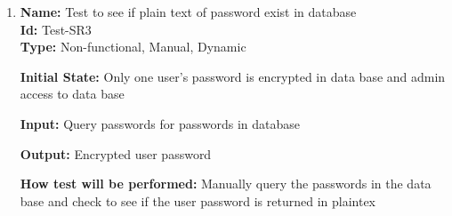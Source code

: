 \documentclass[12pt, titlepage]{article}
\begin{document}
\begin{enumerate}
    					
    					
    					
    
    \item{\textbf{Name:} Test to see if plain text of password exist in database\\} \label{Test-SR3}
    \textbf{Id:} Test-SR3\\
    
    \textbf{Type:} Non-functional, Manual, Dynamic
    					
    \textbf{Initial State:} Only one user's password is encrypted in data base and admin access to data base
    					
    \textbf{Input:} Query passwords for passwords in database
    					
    \textbf{Output:} Encrypted user password
    					
    \textbf{How test will be performed:} Manually query the passwords in the data base and check to see if the user password is returned in plaintex
\end{enumerate}
\end{document}
